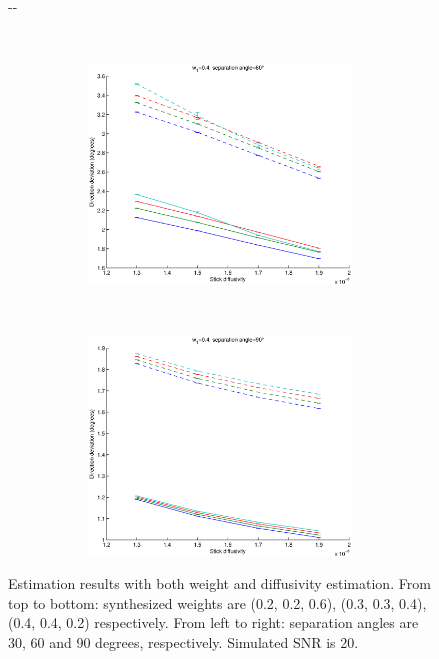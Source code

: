 \documentclass{article}
\begin{document}
\begin{figure}[H]
\begin{adjustwidth}{-\oddsidemargin}{-\rightmargin}
\begin{subfigure}{0.8\paperwidth}
\begin{subfigure}{0.3\textwidth}
      \end{subfigure}
      ~
      \begin{subfigure}{0.3\textwidth}
        \centering
        \includegraphics[width=\textwidth]{figures/synth_bas_weights_diffus__snr=20__w1=4__angle=60.eps}
      \end{subfigure}
      ~
      \begin{subfigure}{0.3\textwidth}
        \centering
        \includegraphics[width=\textwidth]{figures/synth_bas_weights_diffus__snr=20__w1=4__angle=90.eps}
      \end{subfigure}
  \end{subfigure}
\end{adjustwidth}
  \caption{Estimation results with both weight and diffusivity estimation. From top to bottom: synthesized weights are (0.2, 0.2, 0.6), (0.3, 0.3, 0.4), (0.4, 0.4, 0.2) respectively. From left to right: separation angles are 30, 60 and 90 degrees, respectively. Simulated SNR is 20.}
\end{figure}
\end{document}
